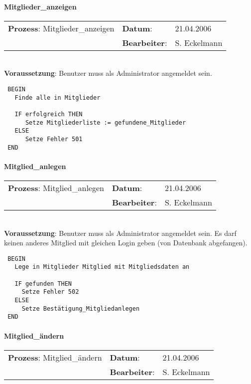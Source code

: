 \paragraph{Mitglieder\_anzeigen}
\begin{tabular}[t]{p{9.5cm}ll}
\textbf{Prozess}: Mitglieder\_anzeigen 	&\textbf{Datum}:      &21.04.2006\\
					&\textbf{Bearbeiter}: &S. Eckelmann\\
\end{tabular}

\hrulefill\\
\textbf{Voraussetzung}: Benutzer muss als Administrator angemeldet sein.
\begin{verbatim}
 BEGIN
   Finde alle in Mitglieder

   IF erfolgreich THEN
      Setze Mitgliederliste := gefundene_Mitglieder
   ELSE
      Setze Fehler 501
 END
\end{verbatim}
\hrulefill

\paragraph{Mitglied\_anlegen}
\begin{tabular}[t]{p{9.5cm}ll}
\textbf{Prozess}: Mitglied\_anlegen  	&\textbf{Datum}:      &21.04.2006\\
					&\textbf{Bearbeiter}: &S. Eckelmann\\
\end{tabular}

\hrulefill\\
\textbf{Voraussetzung}: Benutzer muss als Administrator angemeldet sein. Es darf keinen anderes Mitglied mit gleichen Login geben (von Datenbank abgefangen).
\begin{verbatim}
 BEGIN
   Lege in Mitglieder Mitglied mit Mitgliedsdaten an

   IF gefunden THEN
     Setze Fehler 502
   ELSE
     Setze Bestätigung_Mitgliedanlegen
 END
\end{verbatim}
\hrulefill



\paragraph{Mitglied\_ändern}
\begin{tabular}[t]{p{9.5cm}ll}
\textbf{Prozess}: Mitglied\_ändern  	&\textbf{Datum}:      &21.04.2006\\
					&\textbf{Bearbeiter}: &S. Eckelmann\\
\end{tabular}

